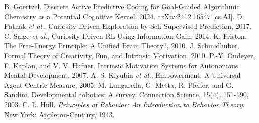 \documentclass[11pt]{article}
\begin{document}
\begin{thebibliography}{99}
 B. Goertzel. Discrete Active Predictive Coding for Goal-Guided Algorithmic Chemistry as a Potential Cognitive Kernel, 2024. arXiv:2412.16547 [cs.AI].
 D. Pathak \emph{et al.}, Curiosity-Driven Exploration by Self-Supervised Prediction, 2017.
 C. Salge \emph{et al.}, Curiosity-Driven RL Using Information-Gain, 2014.
 K. Friston. The Free-Energy Principle: A Unified Brain Theory?, 2010.
 J. Schmidhuber. Formal Theory of Creativity, Fun, and Intrinsic Motivation, 2010.
 P.-Y. Oudeyer, F. Kaplan, and V. V. Hafner. Intrinsic Motivation Systems for Autonomous Mental Development, 2007.
 A. S. Klyubin \emph{et al.}, Empowerment: A Universal Agent-Centric Measure, 2005.
 M. Lungarella, G. Metta, R. Pfeifer, and G. Sandini. Developmental robotics: A survey, Connection Science, 15(4), 151-190, 2003.
 C. L. Hull. \textit{Principles of Behavior: An Introduction to Behavior Theory}. New York: Appleton-Century, 1943.
\end{thebibliography}
\end{document}
